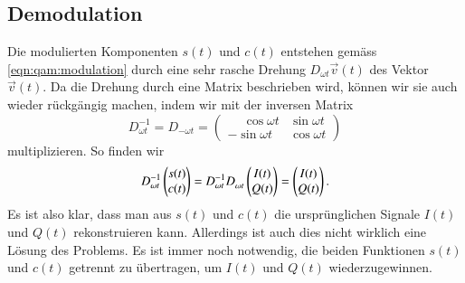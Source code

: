 %
%
%
\subsection{Demodulation
\label{subsection:demodulation}}
Die modulierten Komponenten $s(t)$ und $c(t)$ entstehen gemäss
\eqref{eqn:qam:modulation}
durch eine sehr rasche Drehung $D_{\omega t}\vec{v}(t)$
des Vektor $\vec{v}(t)$.
Da die Drehung durch eine Matrix beschrieben wird, können wir
sie auch wieder rückgängig machen, indem wir mit der inversen
Matrix
\[
D^{-1}_{\omega t} = D_{-\omega t}
=
\begin{pmatrix}
\phantom{-}\cos\omega t & \sin\omega t \\
         - \sin\omega t & \cos\omega t
\end{pmatrix}
\]
multiplizieren.
So finden wir
\[
D_{\omega t}^{-1}
\begin{pmatrix}s(t)\\c(t)\end{pmatrix}
=
D_{\omega t}^{-1}
D_{\omega t}^{\mathstrut}
\begin{pmatrix} I(t)\\Q(t)\end{pmatrix}
=
\begin{pmatrix}
I(t)\\
Q(t)
\end{pmatrix}.
\]
Es ist also klar, dass man aus $s(t)$ und $c(t)$ die ursprünglichen Signale
$I(t)$ und $Q(t)$ rekonstruieren kann.
Allerdings ist auch dies nicht wirklich eine Lösung des Problems.
Es ist immer noch notwendig, die beiden Funktionen $s(t)$ und $c(t)$
getrennt zu übertragen, um $I(t)$ und $Q(t)$ wiederzugewinnen.

